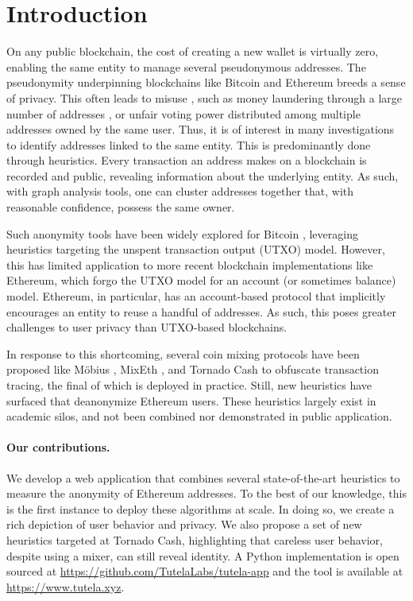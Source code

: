 \section{Introduction}
\label{sec:introduction}

On any public blockchain, the cost of creating a new wallet is virtually zero, enabling the same entity to manage several pseudonymous addresses. The pseudonymity underpinning blockchains like Bitcoin \citep{nakamoto2008bitcoin} and Ethereum \citep{buterin2013ethereum} breeds a sense of privacy. This often leads to misuse \citep{christin2013traveling}, such as money laundering through a large number of addresses \citep{moser2013inquiry}, or unfair voting power distributed among multiple addresses owned by the same user. Thus, it is of interest in many investigations to identify addresses linked to the same entity. This is predominantly done through heuristics. Every transaction an address makes on a blockchain is recorded and public, revealing information about the underlying entity. As such, with graph analysis tools, one can cluster addresses together that, with reasonable confidence, possess the same owner.

Such anonymity tools have been widely explored for Bitcoin \cite{haslhofer2016bitcoin}, leveraging heuristics targeting the unspent transaction output (UTXO) model. However, this has limited application to more recent blockchain implementations like Ethereum, which forgo the UTXO model for an account (or sometimes balance) model.
Ethereum, in particular, has an account-based protocol that implicitly encourages an entity to reuse a handful of addresses.
As such, this poses greater challenges to user privacy than UTXO-based blockchains.

In response to this shortcoming, several coin mixing protocols have been proposed like M\"{o}bius \citep{meiklejohn2018mobius}, MixEth \citep{seres2019mixeth}, and Tornado Cash \citep{pertsev2019tornado} to obfuscate transaction tracing, the final of which is deployed in practice.
Still, new heuristics have surfaced \citep{victor2020address,beres2021blockchain} that deanonymize Ethereum users. These heuristics largely exist in academic silos, and not been combined nor demonstrated in public application.

\paragraph{Our contributions.} We develop a web application that combines several state-of-the-art heuristics to measure the anonymity of Ethereum addresses. 
To the best of our knowledge, this is the first instance to deploy these algorithms at scale.
In doing so, we create a rich depiction of user behavior and privacy.
We also propose a set of new heuristics targeted at Tornado Cash, highlighting that careless user behavior, despite using a mixer, can still reveal identity. A Python implementation is open sourced at \url{https://github.com/TutelaLabs/tutela-app} and the tool is available at \url{https://www.tutela.xyz}.

